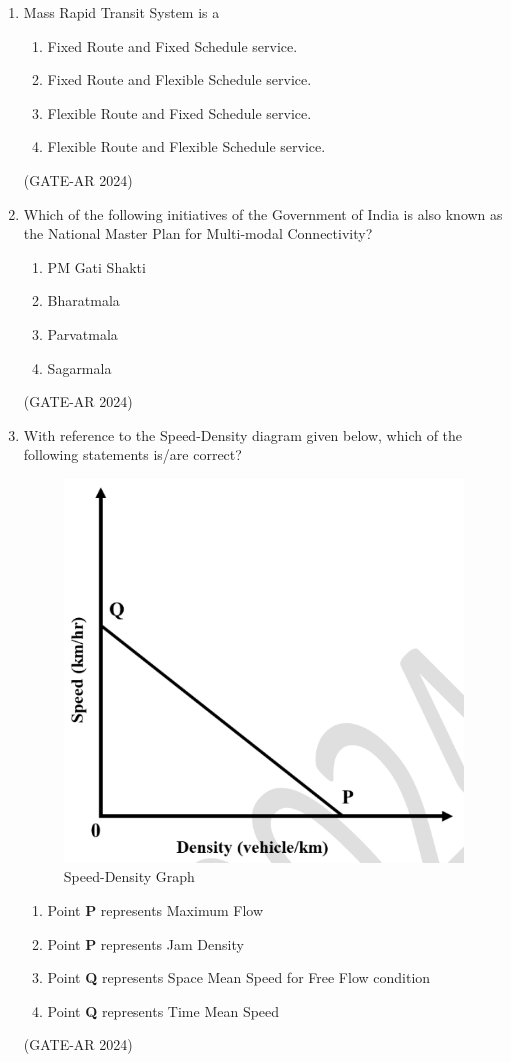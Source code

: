 \documentclass[a4paper,10pt]{article}
\begin{document}
\begin{enumerate}
    \item Mass Rapid Transit System is a
    \begin{enumerate}
        \item Fixed Route and Fixed Schedule service.
        \item Fixed Route and Flexible Schedule service.
        \item Flexible Route and Fixed Schedule service.
        \item Flexible Route and Flexible Schedule service.
    \end{enumerate}
    \hfill (GATE-AR 2024)

    \item Which of the following initiatives of the Government of India is also known as the National Master Plan for Multi-modal Connectivity?
    \begin{multicols}{4}
    \begin{enumerate}
        \item PM Gati Shakti
        \item Bharatmala
        \item Parvatmala
        \item Sagarmala
    \end{enumerate}
    \end{multicols}
    \hfill (GATE-AR 2024)

    \item With reference to the Speed-Density diagram given below, which of the following statements is/are correct? \\
    \begin{figure}[h!]
    \centering
    \includegraphics[width=0.5\columnwidth]{figs/18.jpg}
    \caption{Speed-Density Graph}
    \label{fig:Img18}
    \end{figure}
    \begin{enumerate}
        \item Point \textbf{P} represents Maximum Flow
        \item Point \textbf{P} represents Jam Density
        \item Point \textbf{Q} represents Space Mean Speed for Free Flow condition
        \item Point \textbf{Q} represents Time Mean Speed
    \end{enumerate}
    \hfill (GATE-AR 2024)


\end{enumerate}
\end{document}
